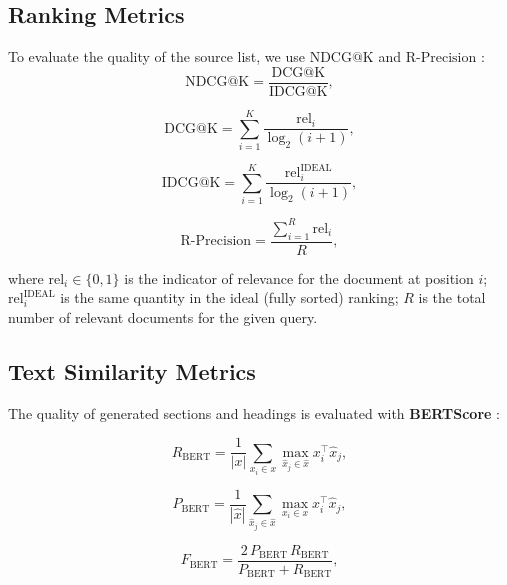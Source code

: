 \documentclass{superfri}
\begin{document}
\subsection{Ranking Metrics}

To evaluate the quality of the source list, we use $\mathrm{NDCG@K}$ \cite{ndcg} and $\mathrm{R\text{-}Precision}$ \cite{rprecision}:
\begin{equation}\label{ndcg}
\mathrm{NDCG@K}= \frac{\mathrm{DCG@K}}{\mathrm{IDCG@K}},
\end{equation}

\begin{equation}\label{dcg}
\mathrm{DCG@K}= \sum_{i=1}^{K} \frac{\mathrm{rel}_i}{\log_2(i+1)},
\end{equation}

\begin{equation}\label{idcg}
\mathrm{IDCG@K}= \sum_{i=1}^{K} \frac{\mathrm{rel}^{\mathrm{IDEAL}}_i}{\log_2(i+1)},
\end{equation}

\begin{equation}\label{rpr}
\mathrm{R\text{-}Precision}= \frac{\sum_{i=1}^{R} \mathrm{rel}_i}{R},
\end{equation}

where $\mathrm{rel}_i\in\{0,1\}$ is the indicator of relevance for the document at position $i$; $\mathrm{rel}^{\mathrm{IDEAL}}_i$ is the same quantity in the ideal (fully sorted) ranking;
$R$ is the total number of relevant documents for the given query.

\subsection{Text Similarity Metrics}
The quality of generated sections and headings is evaluated with \textbf{BERTScore} \cite{bertscore}:

\begin{equation}\label{recall}
R_{\mathrm{BERT}}= \frac{1}{|x|}\sum_{x_i\in x}\max_{\hat{x}_j\in\hat{x}} x_i^\top \hat{x}_j,
\end{equation}

\begin{equation}\label{precision}
P_{\mathrm{BERT}}= \frac{1}{|\hat{x}|}\sum_{\hat{x}_j\in\hat{x}}\max_{x_i\in x} x_i^\top \hat{x}_j,
\end{equation}

\begin{equation}\label{f}
F_{\mathrm{BERT}}= \frac{2\,P_{\mathrm{BERT}}\,R_{\mathrm{BERT}}}{P_{\mathrm{BERT}} + R_{\mathrm{BERT}}},
\end{equation}
\end{document}
